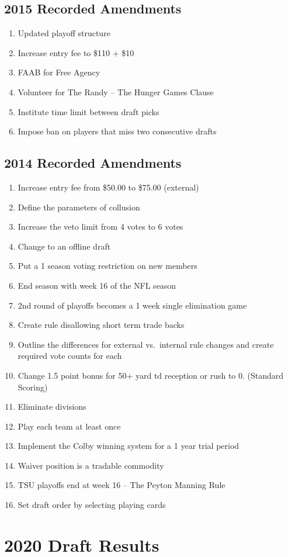 \documentclass[
]{book}
\providecommand{\tightlist}{%
  \setlength{\itemsep}{0pt}\setlength{\parskip}{0pt}}
\begin{document}
\hypertarget{recorded-amendments-6}{%
\section{2015 Recorded Amendments}\label{recorded-amendments-6}}

\begin{enumerate}
\def\labelenumi{\arabic{enumi}.}
\tightlist
\item
  Updated playoff structure
\item
  Increase entry fee to \$110 + \$10
\item
  FAAB for Free Agency
\item
  Volunteer for The Randy -- The Hunger Games Clause
\item
  Institute time limit between draft picks
\item
  Impose ban on players that miss two consecutive drafts
\end{enumerate}

\hypertarget{recorded-amendments-7}{%
\section{2014 Recorded Amendments}\label{recorded-amendments-7}}

\begin{enumerate}
\def\labelenumi{\arabic{enumi}.}
\tightlist
\item
  Increase entry fee from \$50.00 to \$75.00 (external)
\item
  Define the parameters of collusion
\item
  Increase the veto limit from 4 votes to 6 votes
\item
  Change to an offline draft
\item
  Put a 1 season voting restriction on new members
\item
  End season with week 16 of the NFL season
\item
  2nd round of playoffs becomes a 1 week single elimination game
\item
  Create rule disallowing short term trade backs
\item
  Outline the differences for external vs.~internal rule changes and create required vote counts for each
\item
  Change 1.5 point bonus for 50+ yard td reception or rush to 0. (Standard Scoring)
\item
  Eliminate divisions
\item
  Play each team at least once
\item
  Implement the Colby winning system for a 1 year trial period
\item
  Waiver position is a tradable commodity
\item
  TSU playoffs end at week 16 -- The Peyton Manning Rule
\item
  Set draft order by selecting playing cards
\end{enumerate}

\hypertarget{draft-results}{%
\chapter{2020 Draft Results}\label{draft-results}}

  
\end{document}
